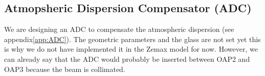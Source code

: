 \documentclass[12pt,a4paper]{article}
\begin{document}
\subsection{Atmopsheric Dispersion Compensator (ADC)}
We are designing an ADC to compensate the atmospheric dispersion (see appendix\ref{app:ADC}). The geometric parameters and the glass are not set yet this is why we do not have implemented it in the Zemax model for now. However, we can already say that the ADC would probably be inserted between OAP2 and OAP3 because the beam is collimated.
\newpage

\renewcommand{\bibname}{References}


\end{document}
